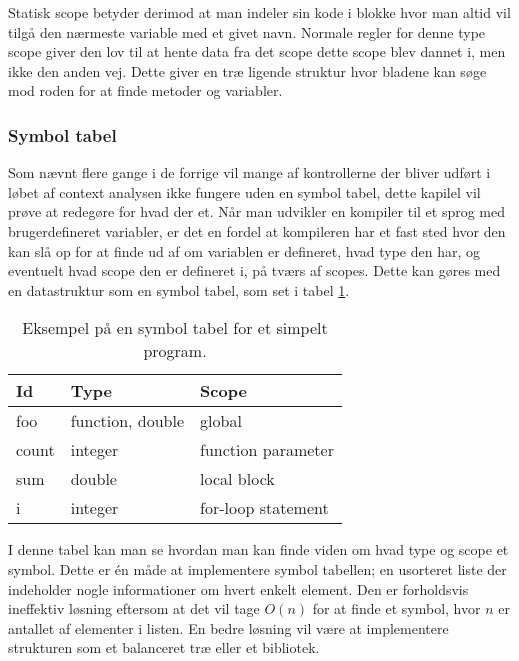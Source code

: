 Statisk scope betyder derimod at man indeler sin kode i blokke hvor man altid vil tilgå den nærmeste variable med et givet navn. Normale regler for denne type scope giver den lov til at hente data fra det scope dette scope blev dannet i, men ikke den anden vej. Dette giver en træ ligende struktur hvor bladene kan søge mod roden for at finde metoder og variabler.


    
    
\subsubsection{Symbol tabel}
    Som nævnt flere gange i de forrige vil mange af kontrollerne der bliver udført i løbet af context analysen ikke fungere uden en symbol tabel, dette kapilel vil prøve at redegøre for hvad der et. Når man udvikler en kompiler til et sprog med brugerdefineret variabler, er det en fordel at kompileren har et fast sted hvor den kan slå op for at finde ud af om variablen er defineret, hvad type den har, og eventuelt hvad scope den er defineret i, på tværs af scopes. Dette kan gøres med en datastruktur som en symbol tabel, som set i tabel \ref{tab:symboltabel}.
    

    \begin{table}[H]
    \centering\footnotesize
    \begin{tabular}{l|l|l}
    \textbf{Id} & \textbf{Type} & \textbf{Scope} \\\bottomrule
    foo & function, double & global\\
    count & integer & function parameter\\
    sum & double & local block\\
    i & integer & for-loop statement
    \end{tabular}
    \caption{Eksempel på en symbol tabel for et simpelt program.}
    \label{tab:symboltabel}
    \end{table}
    
\noindent I denne tabel kan man se hvordan man kan finde viden om hvad type og scope et symbol. Dette er én måde at implementere symbol tabellen; en usorteret liste der indeholder nogle informationer om hvert enkelt element. Den er forholdsvis ineffektiv løsning eftersom at det vil tage $O(n)$ for at finde et symbol, hvor $n$ er antallet af elementer i listen. En bedre løsning vil være at implementere strukturen som et balanceret træ eller et bibliotek.\\
    
